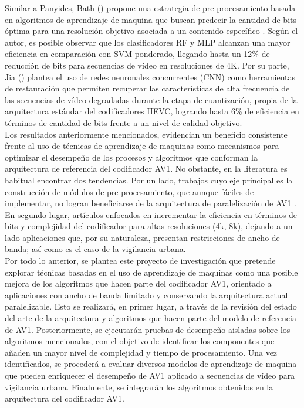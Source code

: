 \documentclass{article}
\begin{document}
Similar a Panyides, Bath  (\citeyear{9102934}) propone una estrategia de pre-procesamiento basada en algoritmos de aprendizaje de maquina que buscan predecir la cantidad de bits óptima para una resolución objetivo asociada a un contenido específico \citep{Netflix}. Según el autor, es posible observar que los clasificadores RF \citep{rf} y MLP alcanzan una mayor eficiencia en comparación con SVM ponderado, llegando hasta un 12\% de reducción de bits para secuencias de vídeo en resoluciones de 4K. Por su parte,  Jia (\citeyear{8630681}) plantea el uso de redes neuronales concurrentes (CNN) como herramientas de restauración que permiten recuperar las características de alta frecuencia de las secuencias de vídeo degradadas durante la etapa de cuantización, propia de la arquitectura estándar del codificadores HEVC, logrando hasta 6\% de eficiencia en términos de cantidad de bits frente a un nivel de calidad objetivo.\\

Los resultados anteriormente mencionados, evidencian un beneficio consistente frente al uso de técnicas de aprendizaje de maquinas como mecanismos para optimizar el desempeño de los procesos y algoritmos que conforman la arquitectura de referencia del codificador AV1. No obstante, en la literatura es habitual encontrar dos tendencias. Por un lado, trabajos cuyo eje principal es la construcción de módulos de pre-procesamiento, que aunque fáciles de implementar, no logran beneficiarse de la arquitectura de paralelización de AV1 \citep{svt}. En segundo lugar, artículos enfocados en incrementar la eficiencia en términos de bits y complejidad del codificador para altas resoluciones (4k, 8k), dejando a un lado aplicaciones que, por su naturaleza, presentan restricciones de ancho de banda; así como es el caso de la vigilancia urbana. \\

Por todo lo anterior, se plantea este proyecto de investigación que pretende explorar técnicas basadas en el uso de aprendizaje de maquinas como una posible mejora de los algoritmos que hacen parte del codificador AV1, orientado a aplicaciones con ancho de banda limitado y conservando la arquitectura actual paralelizable. Esto se realizará, en primer lugar, a través de la revisión del estado del arte de la arquitectura y algoritmos que hacen parte del modelo de referencia de AV1. Posteriormente, se ejecutarán pruebas de desempeño aisladas sobre los algoritmos mencionados, con el objetivo de identificar los componentes que añaden un mayor nivel de complejidad y tiempo de procesamiento. Una vez identificados, se procederá a evaluar diversos modelos de aprendizaje de maquina que pueden enriquecer el desempeño de AV1 aplicado a secuencias de vídeo para vigilancia urbana. Finalmente, se integrarán los algoritmos obtenidos en la arquitectura del codificador AV1.
  
  












\end{document}
